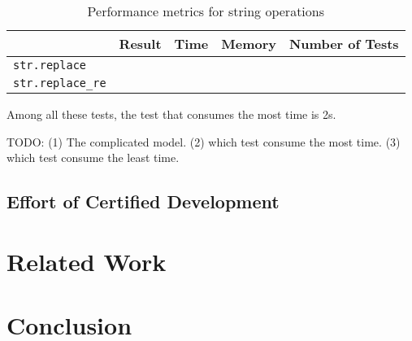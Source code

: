 \documentclass[a4paper,UKenglish,cleveref, autoref, thm-restate]{lipics-v2021}
\begin{document}
\begin{table}[h]
  \centering
  \begin{tabular}{lcccc}
      \toprule
      & \textbf{Result} & \textbf{Time} & \textbf{Memory} & \textbf{Number of Tests} \\
      \midrule
      \texttt{str.replace} & & & & \\
      \texttt{str.replace\_re} & & & & \\
      \bottomrule
  \end{tabular}
  \caption{Performance metrics for string operations}
  \label{tab:string_operations}
\end{table}

Among all these tests, the test that consumes the most time is 2s.


TODO: 
(1) The complicated model.
(2) which test consume the most time.
(3) which test consume the least time. 




\subsection{Effort of Certified Development}


\section{Related Work}

\section{Conclusion}



\end{document}
